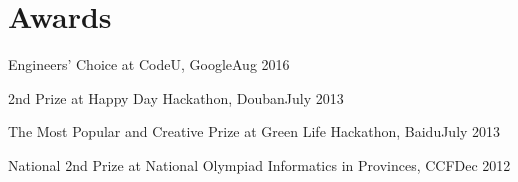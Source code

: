 \documentclass{article}
\begin{document}
\section{Awards}

\ralewaysb Engineers' Choice \raleway at CodeU, Google\hfill Aug 2016

\ralewaysb 2nd Prize \raleway at Happy Day Hackathon, Douban\hfill July 2013

\ralewaysb The Most Popular and Creative Prize \raleway at Green Life Hackathon, Baidu\hfill July 2013

\ralewaysb National 2nd Prize \raleway at National Olympiad Informatics in Provinces, CCF\hfill Dec 2012
\end{document}
